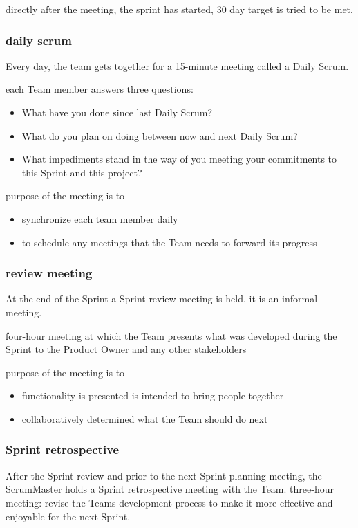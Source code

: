 directly after the meeting, the sprint has started, 30 day target is tried to be met.




\subsubsection{daily scrum}

Every day, the team gets together for a 15-minute meeting called a Daily Scrum.

each Team member answers three questions:

\begin{itemize}
  \item What have you done since last Daily Scrum?
  \item What do you plan on doing between now and next Daily Scrum?
  \item What impediments stand in the way of you meeting your commitments to this Sprint and this project? 
\end{itemize}

purpose of the meeting is to
\begin{itemize}
  \item synchronize each team member daily
  \item to schedule any meetings that the Team needs to forward its progress
\end{itemize}





\subsubsection{review meeting}

At the end of the Sprint a Sprint review meeting is held, it is an informal meeting.

four-hour meeting at which the Team presents what was developed during the Sprint to the Product Owner and any other stakeholders

purpose of the meeting is to
\begin{itemize}
  \item functionality is presented is intended to bring people together
  \item collaboratively determined what the Team should do next
\end{itemize}


\subsubsection{Sprint retrospective}
After the Sprint review and prior to the next Sprint planning meeting, the ScrumMaster holds a Sprint retrospective meeting with the Team. three-hour meeting: revise the Teams development process to make it more effective and enjoyable for the next Sprint. 

